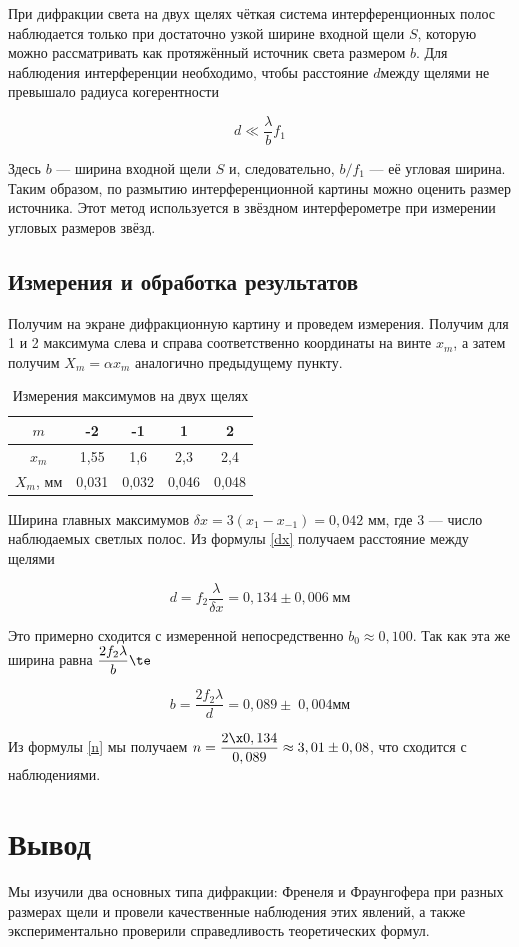 \documentclass[12pt]{kiarticle} %
\begin{document}
При дифракции света на двух щелях чёткая система интерференционных полос наблюдается только при достаточно узкой ширине входной щели $ S $, которую можно рассматривать как протяжённый источник света размером $ b $. Для наблюдения интерференции необходимо, чтобы расстояние $ d $между щелями не превышало радиуса когерентности

\begin{equation}\label{}
d \ll \dfrac{\lambda}{b} f_1
\end{equation}

Здесь $ b $ --- ширина входной щели $ S $ и, следовательно, $  b/f_1 $ --- её угловая ширина. Таким образом, по размытию интерференционной картины можно оценить размер источника. Этот метод используется в звёздном интерферометре при измерении угловых размеров звёзд.

\subsection{Измерения и обработка результатов}

Получим на экране дифракционную картину и проведем измерения. Получим для 1 и 2 максимума слева и справа соответственно координаты на винте $ x_m $, а затем получим $ X_m = \alpha x_m $ аналогично предыдущему пункту. 

\begin{table}[h!]
	\centering
	\caption{Измерения максимумов на двух щелях}
\begin{tabular}{|c|c|c|c|c|}
	\hline 
	$m$ & -2 & -1 & 1 & 2 \\ 
	\hline 
	$x_m$ & 1,55 & 1,6 & 2,3 & 2,4 \\ 
	\hline 
	$X_m$, мм & 0,031 & 0,032 & 0,046 & 0,048 \\ 
	\hline 
\end{tabular}   
\end{table}

 Ширина главных максимумов $  \delta x  = 3 (x_{1} - x_{-1} )= 0,042 $ мм, где 3 --- число наблюдаемых светлых полос. Из формулы \eqref{dx} получаем расстояние между щелями 
 
 \begin{equation}\label{}
 d = f_2 \dfrac{\lambda}{\delta x} = 0,134 \pm 0,006 \; мм
 \end{equation}
 
Это примерно сходится с измеренной непосредственно $ b_0 \approx 0,100 $. Так как эта же ширина равна $ \dfrac{2f_2 \lambda}{b} \te $
 
 \begin{equation}\label{}
 b = \dfrac{2 f_2 \lambda}{d} = 0,089 \pm \;0,004 мм
 \end{equation}
 
 Из формулы \eqref{n} мы получаем $ n = \dfrac{2 \x 0,134}{0,089} \approx 3,01 \pm 0,08 $, что сходится с наблюдениями. 
 
 \section{Вывод}
 
 Мы изучили два основных типа дифракции: Френеля и Фраунгофера при разных размерах щели и провели качественные наблюдения этих явлений, а также экспериментально проверили справедливость теоретических формул.  
\end{document}
